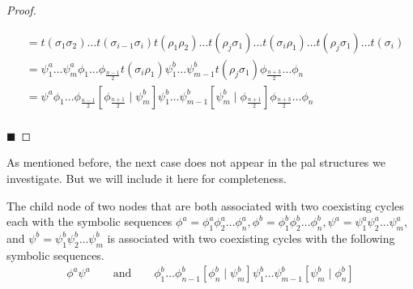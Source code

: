 \begin{proof}
\begin{enumerate}
\begin{align*}
			                    & =
			      t(\sigma_1\sigma_2) \dots t(\sigma_{i-1}\sigma_i) t(\rho_1\rho_2) \dots t(\rho_j \sigma_1) \dots t(\sigma_i\rho_1) \dots t(\rho_j\sigma_1) \dots t(\sigma_i) \\
			                    & =
			      \psi^a_1 \dots \psi^a_m
			      \phi_1 \dots \phi_{\frac{n-1}{2}} t(\sigma_i \rho_1)
			      \psi^b_1 \dots \psi^b_{m-1} t(\rho_j \sigma_1)
			      \phi_{\frac{n+3}{2}} \dots \phi_n                                                                                                                            \\
			                    & =
			      \psi^a
			      \phi_1 \dots \phi_{\frac{n-1}{2}} \left[\phi_{\frac{n+1}{2}} \mid \psi^b_m\right]
			      \psi^b_1 \dots \psi^b_{m-1} \left[\psi^b_m \mid \phi_{\frac{n+1}{2}}\right]
			      \phi_{\frac{n+3}{2}} \dots \phi_n                                                                                                                            \\
		      \end{align*}
	\end{enumerate}
	\hfill $\blacksquare$
\end{proof}

As mentioned before, the next case does not appear in the \gls{pal} structures we investigate.
But we will include it here for completeness.

\begin{theorem}
	The child node of two nodes that are both associated with two coexisting cycles each with the symbolic sequences $\phi^a = \phi^a_1\phi^a_2\dots\phi^a_n, \phi^b = \phi^b_1\phi^b_2\dots\phi^b_n, \psi^a = \psi^a_1\psi^a_2\dots\psi^a_m,$ and $\psi^b = \psi^b_1\psi^b_2\dots\psi^b_m$ is associated with two coexisting cycles with the following symbolic sequences.
	\begin{align}
		\phi^a\psi^a \qquad \text{and} \qquad
		\phi^b_1 \dots \phi^b_{n-1} \left[\phi^b_n \mid \psi^b_m\right] \psi^b_1 \dots \psi^b_{m-1} \left[\psi^b_m \mid \phi^b_n\right]
	\end{align}
\end{theorem}


